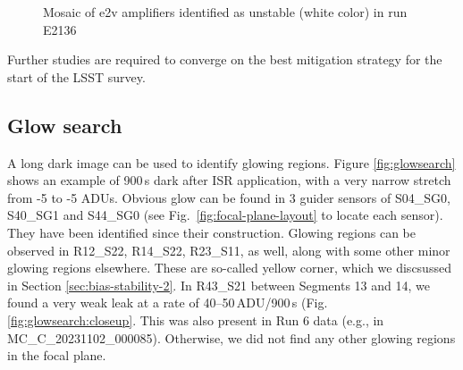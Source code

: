 \begin{figure}[htbp]
\begin{minipage}{0.45\textwidth}
    \caption{Mosaic of e2v amplifiers identified as unstable (white color) in run E2136}
    \label{fig:stability_mosaic}
\end{minipage}
\end{figure}

%

Further studies are required to converge on the best mitigation
strategy for the start of the LSST survey.
\clearpage
\subsection{Glow search}
A long dark image can be used to identify glowing regions. Figure \ref{fig:glowsearch} shows an example of 900\,s dark after ISR application, with a very narrow stretch from -5 to -5 ADUs. 
Obvious glow can be found in 3 guider sensors of S04\_SG0, S40\_SG1 and S44\_SG0 (see Fig.~\ref{fig:focal-plane-layout} to locate each sensor). They have been identified since their construction.
Glowing regions can be observed in R12\_S22, R14\_S22, R23\_S11, as well, along with some other minor glowing regions elsewhere. These are so-called yellow corner, which we discsussed in Section \ref{sec:bias-stability-2}.
In R43\_S21 between Segments 13 and 14, we found a very weak leak at a rate of 40--50\,ADU/900\,s (Fig. \ref{fig:glowsearch:closeup}. This was also present in Run 6 data (e.g., in MC\_C\_20231102\_000085).
Otherwise, we did not find any other glowing regions in the focal plane.

